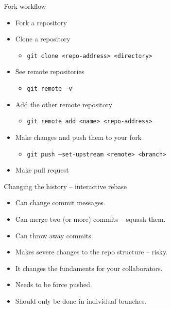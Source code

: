 \documentclass[14pt]{beamer}
\begin{document}
	\begin{frame}{Fork workflow}
	\begin{itemize}
		\item Fork a repository
		\item Clone a repository
	        \begin{itemize}
		    \item \texttt{git clone <repo-address> <directory>}
	        \end{itemize}
		\item See remote repositories
	        \begin{itemize}
		    \item \texttt{git remote -v}
	        \end{itemize}
		\item Add the other remote repository
	        \begin{itemize}
		    \item \texttt{git remote add <name> <repo-address>}
	        \end{itemize}
		\item Make changes and push them to your fork
	        \begin{itemize}
		    \item \texttt{git push --set-upstream <remote> <branch>}
	        \end{itemize}
		\item Make pull request
	\end{itemize}
	\end{frame}

	\begin{frame}{Changing the history -- interactive rebase}
	\begin{itemize}
		\item Can change commit messages.
		\item Can merge two (or more) commits -- squash them.
		\item Can throw away commits.
		\item Makes severe changes to the repo structure -- risky.
		\item It changes the fundaments for your collaborators.
		\item Needs to be force pushed.
		\item Should only be done in individual branches.
	\end{itemize}
\end{frame}
\end{document}
